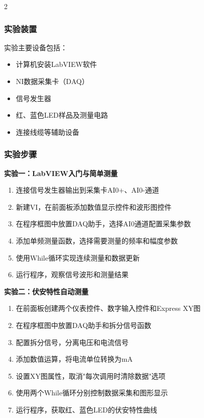 \documentclass[12pt,a4paper]{article}
\begin{document}
\begin{multicols}{2}
    \subsubsection{实验装置}
    实验主要设备包括：
    \begin{itemize}
        \item 计算机安装LabVIEW软件
        \item NI数据采集卡（DAQ）
        \item 信号发生器
        \item 红、蓝色LED样品及测量电路
        \item 连接线缆等辅助设备
    \end{itemize}

    \subsubsection{实验步骤}
    \textbf{实验一：LabVIEW入门与简单测量}
    \begin{enumerate}
        \item 连接信号发生器输出到采集卡AI0+、AI0-通道
        \item 新建VI，在前面板添加数值显示控件和波形图控件
        \item 在程序框图中放置DAQ助手，选择AI0通道配置采集参数
        \item 添加单频测量函数，选择需要测量的频率和幅度参数
        \item 使用While循环实现连续测量和数据更新
        \item 运行程序，观察信号波形和测量结果
    \end{enumerate}

    \textbf{实验二：伏安特性自动测量}
    \begin{enumerate}
        \item 在前面板创建两个仪表控件、数字输入控件和Express XY图
        \item 在程序框图中放置DAQ助手和拆分信号函数
        \item 配置拆分信号，分离电压和电流信号
        \item 添加数值运算，将电流单位转换为mA
        \item 设置XY图属性，取消"每次调用时清除数据"选项
        \item 使用两个While循环分别控制数据采集和图形显示
        \item 运行程序，获取红、蓝色LED的伏安特性曲线
    \end{enumerate}


\end{multicols}
\end{document}

